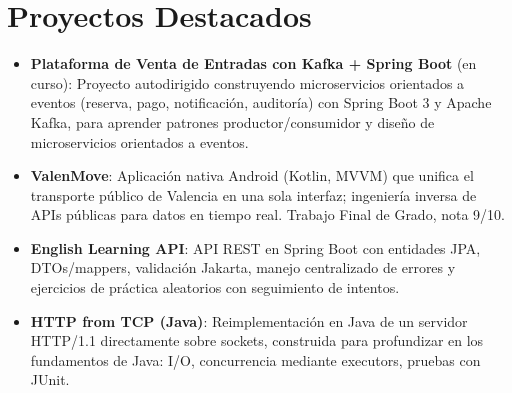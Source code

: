 \documentclass[11pt,a4paper,sans]{moderncv}
\begin{document}

\section{Proyectos Destacados}
\vspace{1pt}
\begin{itemize}

\item \textbf{Plataforma de Venta de Entradas con Kafka + Spring Boot} (en curso): Proyecto autodirigido construyendo microservicios orientados a eventos (reserva, pago, notificación, auditoría) con Spring Boot 3 y Apache Kafka, para aprender patrones productor/consumidor y diseño de microservicios orientados a eventos.

\item \textbf{ValenMove}: Aplicación nativa Android (Kotlin, MVVM) que unifica el transporte público de Valencia en una sola interfaz; ingeniería inversa de APIs públicas para datos en tiempo real. Trabajo Final de Grado, nota 9/10.

\item \textbf{English Learning API}: API REST en Spring Boot con entidades JPA, DTOs/mappers, validación Jakarta, manejo centralizado de errores y ejercicios de práctica aleatorios con seguimiento de intentos.

\item \textbf{HTTP from TCP (Java)}: Reimplementación en Java de un servidor HTTP/1.1 directamente sobre sockets, construida para profundizar en los fundamentos de Java: I/O, concurrencia mediante executors, pruebas con JUnit.

\end{itemize}


\end{document}
